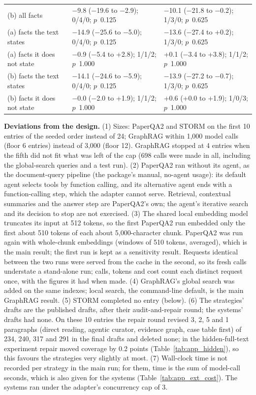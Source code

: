 \documentclass{article} %
\begin{document}
\begin{table}[!htbp]
\begin{tabularx}{\linewidth}{>{\raggedright\arraybackslash}p{3.0cm}>{\centering\arraybackslash}X>{\centering\arraybackslash}X}
(b) all facts & $-$9.8 ($-$19.6 to $-$2.9); 0/4/0; $p$~0.125 & $-$10.1 ($-$21.8 to $-$0.2); 1/3/0; $p$~0.625 \\
(a) facts the text states & $-$14.9 ($-$25.6 to $-$5.0); 0/4/0; $p$~0.125 & $-$13.6 ($-$27.4 to +0.2); 1/3/0; $p$~0.625 \\
(a) facts it does not state & $-$0.9 ($-$5.4 to +2.8); 1/1/2; $p$~1.000 & +0.1 ($-$3.4 to +3.8); 1/1/2; $p$~1.000 \\
(b) facts the text states & $-$14.1 ($-$24.6 to $-$5.9); 0/4/0; $p$~0.125 & $-$13.9 ($-$27.2 to $-$0.7); 1/3/0; $p$~0.625 \\
(b) facts it does not state & $-$0.0 ($-$2.0 to +1.9); 1/1/2; $p$~1.000 & +0.6 (+0.0 to +1.9); 1/0/3; $p$~1.000 \\
\bottomrule
\end{tabularx}
\end{table}

\textbf{Deviations from the design.} (1) Sizes: PaperQA2 and STORM on the first 10 entries of the seeded order instead of 24; GraphRAG within 1,000 model calls (floor 6 entries) instead of 3,000 (floor 12). GraphRAG stopped at 4 entries when the fifth did not fit what was left of the cap (698 calls were made in all, including the global-search queries and a test run). (2) PaperQA2 ran without its agent, as the document-query pipeline (the package's manual, no-agent usage): its default agent selects tools by function calling, and its alternative agent ends with a function-calling step, which the adapter cannot serve. Retrieval, contextual summaries and the answer step are PaperQA2's own; the agent's iterative search and its decision to stop are not exercised. (3) The shared local embedding model truncates its input at 512 tokens, so the first PaperQA2 run embedded only the first about 510 tokens of each about 5,000-character chunk. PaperQA2 was run again with whole-chunk embeddings (windows of 510 tokens, averaged), which is the main result; the first run is kept as a sensitivity result. Requests identical between the two runs were served from the cache in the second, so its fresh calls understate a stand-alone run; calls, tokens and cost count each distinct request once, with the figures it had when made. (4) GraphRAG's global search was added on the same indexes; local search, the command-line default, is the main GraphRAG result. (5) STORM completed no entry (below). (6) The strategies' drafts are the published drafts, after their audit-and-repair round; the systems' drafts had none. On these 10 entries the repair round revised 3, 2, 5 and 1 paragraphs (direct reading, agentic curator, evidence graph, case table first) of 234, 240, 317 and 291 in the final drafts and deleted none; in the hidden-full-text experiment repair moved coverage by 0.2 points (Table~\ref{tab:app_hidden}), so this favours the strategies very slightly at most. (7) Wall-clock time is not recorded per strategy in the main run; for them, time is the sum of model-call seconds, which is also given for the systems (Table~\ref{tab:app_ext_cost}). The systems ran under the adapter's concurrency cap of 3.
\end{document}
